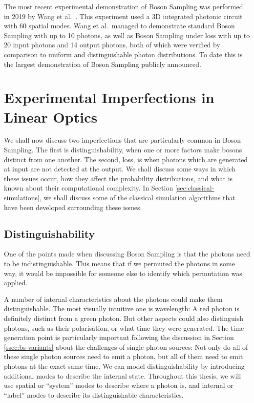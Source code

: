 The most recent experimental demonstration of Boson Sampling was performed in 2019 by Wang et al.~\cite{wang2019}. This experiment used a 3D integrated photonic circuit with 60 spatial modes. Wang et al.\ managed to demonstrate standard Boson Sampling with up to 10 photons, as well as Boson Sampling under loss with up to 20 input photons and 14 output photons, both of which were verified by comparison to uniform and distinguishable photon distributions. To date this is the largest demonstration of Boson Sampling publicly announced.

\section{Experimental Imperfections in Linear Optics}
\label{sec:lo-imperfections}

We shall now discuss two imperfections that are particularly common in Boson Sampling. The first is distinguishability, when one or more factors make bosons distinct from one another. The second, loss, is when photons which are generated at input are not detected at the output. We shall discuss some ways in which these issues occur, how they affect the probability distributions, and what is known about their computational complexity. In Section \ref{sec:classical-simulations}, we shall discuss some of the classical simulation algorithms that have been developed surrounding these issues.

\subsection{Distinguishability}
\label{ssec:imperfections-distinguishability}

One of the points made when discussing Boson Sampling is that the photons need to be indistinguishable. This means that if we permuted the photons in some way, it would be impossible for someone else to identify which permutation was applied.

A number of internal characteristics about the photons could make them distinguishable. The most visually intuitive one is wavelength: A red photon is definitely distinct from a green photon. But other aspects could also distinguish photons, such as their polarisation, or what time they were generated. The time generation point is particularly important following the discussion in Section \ref{ssec:bs-variants} about the challenges of single photon sources: Not only do all of these single photon sources need to emit a photon, but all of them need to emit photons at the exact same time. We can model distinguishability by introducing additional modes to describe the internal state. Throughout this thesis, we will use spatial or ``system'' modes to describe where a photon is, and internal or ``label'' modes to describe its distinguishable characteristics.

